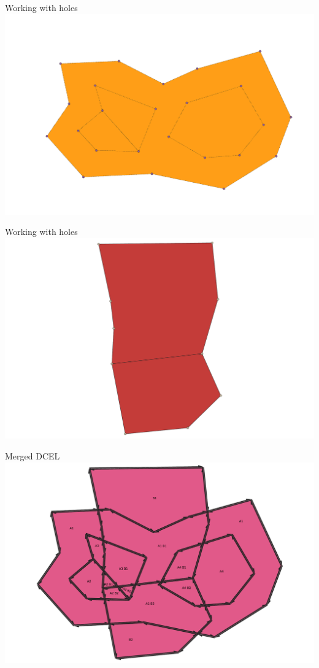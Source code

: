 \documentclass{beamer}
\begin{document}
\begin{frame}{Working with holes}
    \centering 
    \includegraphics[trim=3cm 0cm 2cm 0cm, clip, width=0.75\linewidth]{figures/Holes01} 
\end{frame}
\begin{frame}{Working with holes}
    \centering 
    \includegraphics[trim=3cm 0cm 2cm 0cm, clip, width=0.75\linewidth]{figures/Holes02} 
\end{frame}
\begin{frame}{Merged DCEL}
    \centering 
    \includegraphics[trim=3cm 0cm 2cm 0cm, clip, width=0.75\linewidth]{figures/Holes03} 
\end{frame}
\end{document}
